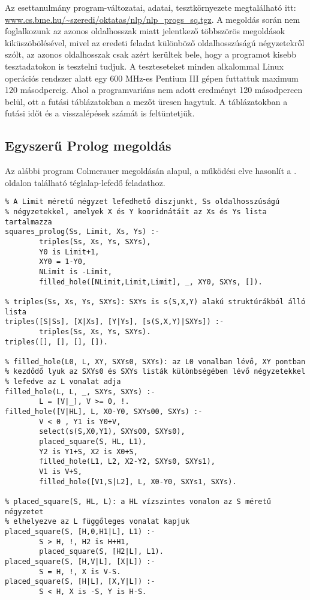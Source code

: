 Az esettanulmány program-változatai, adatai, tesztkörnyezete
megtalálható itt: \url{www.cs.bme.hu/~szeredi/oktatas/nlp/nlp_progs_sq.tgz}.
\br
A megoldás során nem foglalkozunk az azonos oldalhosszak miatt jelentkező többszörös
megoldások kiküszöbölésével, mivel az eredeti feladat különböző oldalhosszúságú négyzetekről
szólt, az azonos oldalhosszak csak azért kerültek bele, hogy a programot kisebb
tesztadatokon is tesztelni tudjuk. A teszteseteket minden alkalommal Linux operációs
rendszer alatt egy 600 MHz-es Pentium III gépen futtattuk maximum 120 másodpercig. Ahol
a programvariáns nem adott eredményt 120 másodpercen belül, ott a futási táblázatokban
a mezőt üresen hagytuk. A táblázatokban a futási időt és a visszalépések számát
is feltüntetjük.

\subsection{Egyszerű Prolog megoldás}

Az alábbi program Colmerauer \clpr megoldásán alapul, a működési elve hasonlít a
\pageref{teglalap:clpqr}. oldalon található téglalap-lefedő feladathoz.

\begin{verbatim}
% A Limit méretű négyzet lefedhető diszjunkt, Ss oldalhosszúságú
% négyzetekkel, amelyek X és Y kooridnátáit az Xs és Ys lista tartalmazza
squares_prolog(Ss, Limit, Xs, Ys) :-
        triples(Ss, Xs, Ys, SXYs),
        Y0 is Limit+1,
        XY0 = 1-Y0,
        NLimit is -Limit,
        filled_hole([NLimit,Limit,Limit], _, XY0, SXYs, []).

% triples(Ss, Xs, Ys, SXYs): SXYs is s(S,X,Y) alakú struktúrákból álló lista
triples([S|Ss], [X|Xs], [Y|Ys], [s(S,X,Y)|SXYs]) :-
        triples(Ss, Xs, Ys, SXYs).
triples([], [], [], []).

% filled_hole(L0, L, XY, SXYs0, SXYs): az L0 vonalban lévő, XY pontban
% kezdődő lyuk az SXYs0 és SXYs listák különbségében lévő négyzetekkel
% lefedve az L vonalat adja
filled_hole(L, L, _, SXYs, SXYs) :-
        L = [V|_], V >= 0, !.
filled_hole([V|HL], L, X0-Y0, SXYs00, SXYs) :-
        V < 0 , Y1 is Y0+V,
        select(s(S,X0,Y1), SXYs00, SXYs0),
        placed_square(S, HL, L1),
        Y2 is Y1+S, X2 is X0+S,
        filled_hole(L1, L2, X2-Y2, SXYs0, SXYs1),
        V1 is V+S,
        filled_hole([V1,S|L2], L, X0-Y0, SXYs1, SXYs).

% placed_square(S, HL, L): a HL vízszintes vonalon az S méretű négyzetet
% elhelyezve az L függőleges vonalat kapjuk
placed_square(S, [H,0,H1|L], L1) :-
        S > H, !, H2 is H+H1,
        placed_square(S, [H2|L], L1).
placed_square(S, [H,V|L], [X|L]) :-
        S = H, !, X is V-S.
placed_square(S, [H|L], [X,Y|L]) :-
        S < H, X is -S, Y is H-S.
\end{verbatim}

